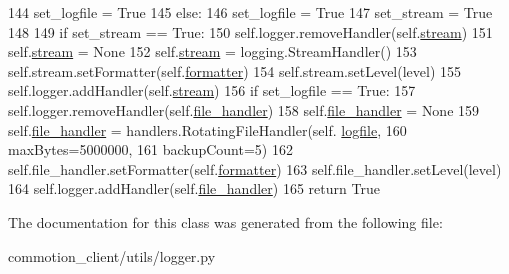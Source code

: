 \begin{DoxyCode}
144             set\_logfile = \textcolor{keyword}{True}
145         \textcolor{keywordflow}{else}:
146             set\_logfile = \textcolor{keyword}{True}
147             set\_stream = \textcolor{keyword}{True}
148 
149         \textcolor{keywordflow}{if} set\_stream == \textcolor{keyword}{True}:
150             self.logger.removeHandler(self.\hyperlink{classcommotion__client_1_1utils_1_1logger_1_1LogHandler_a83d51d996fcf161a5b107a2589f96966}{stream})
151             self.\hyperlink{classcommotion__client_1_1utils_1_1logger_1_1LogHandler_a83d51d996fcf161a5b107a2589f96966}{stream} = \textcolor{keywordtype}{None}
152             self.\hyperlink{classcommotion__client_1_1utils_1_1logger_1_1LogHandler_a83d51d996fcf161a5b107a2589f96966}{stream} = logging.StreamHandler()
153             self.stream.setFormatter(self.\hyperlink{classcommotion__client_1_1utils_1_1logger_1_1LogHandler_adbe12df7374590dd37a12eb84ee48a41}{formatter})
154             self.stream.setLevel(level)
155             self.logger.addHandler(self.\hyperlink{classcommotion__client_1_1utils_1_1logger_1_1LogHandler_a83d51d996fcf161a5b107a2589f96966}{stream})
156         \textcolor{keywordflow}{if} set\_logfile == \textcolor{keyword}{True}:
157             self.logger.removeHandler(self.\hyperlink{classcommotion__client_1_1utils_1_1logger_1_1LogHandler_afe5e88e544dd8855d6d1b52255e6d531}{file\_handler})
158             self.\hyperlink{classcommotion__client_1_1utils_1_1logger_1_1LogHandler_afe5e88e544dd8855d6d1b52255e6d531}{file\_handler} = \textcolor{keywordtype}{None}
159             self.\hyperlink{classcommotion__client_1_1utils_1_1logger_1_1LogHandler_afe5e88e544dd8855d6d1b52255e6d531}{file\_handler} = handlers.RotatingFileHandler(self.
      \hyperlink{classcommotion__client_1_1utils_1_1logger_1_1LogHandler_a92d313ddde96b6e1765514f4596f26f2}{logfile},
160                                                             maxBytes=5000000,
161                                                             backupCount=5)
162             self.file\_handler.setFormatter(self.\hyperlink{classcommotion__client_1_1utils_1_1logger_1_1LogHandler_adbe12df7374590dd37a12eb84ee48a41}{formatter})
163             self.file\_handler.setLevel(level)
164             self.logger.addHandler(self.\hyperlink{classcommotion__client_1_1utils_1_1logger_1_1LogHandler_afe5e88e544dd8855d6d1b52255e6d531}{file\_handler})
165         \textcolor{keywordflow}{return} \textcolor{keyword}{True}

\end{DoxyCode}


The documentation for this class was generated from the following file\+:\begin{DoxyCompactItemize}
\item 
commotion\+\_\+client/utils/logger.\+py\end{DoxyCompactItemize}
